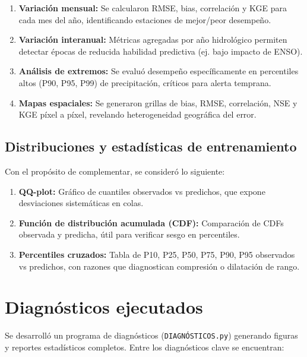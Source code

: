 \begin{enumerate}
    \item \textbf{Variación mensual:} Se calcularon RMSE, bias, correlación y KGE para cada mes del año, identificando estaciones de mejor/peor desempeño.
    \item \textbf{Variación interanual:} Métricas agregadas por año hidrológico permiten detectar épocas de reducida habilidad predictiva (ej. bajo impacto de ENSO).
    \item \textbf{Análisis de extremos:} Se evaluó desempeño específicamente en percentiles altos (P90, P95, P99) de precipitación, críticos para alerta temprana.
    \item \textbf{Mapas espaciales:} Se generaron grillas de bias, RMSE, correlación, NSE y KGE píxel a píxel, revelando heterogeneidad geográfica del error.
\end{enumerate}

\subsection{Distribuciones y estadísticas de entrenamiento}

Con el propósito de complementar, se consideró lo siguiente:
\begin{enumerate}
    \item \textbf{QQ-plot:} Gráfico de cuantiles observados vs predichos, que expone desviaciones sistemáticas en colas.
    \item \textbf{Función de distribución acumulada (CDF):} Comparación de CDFs observada y predicha, útil para verificar sesgo en percentiles.
    \item \textbf{Percentiles cruzados:} Tabla de P10, P25, P50, P75, P90, P95 observados vs predichos, con razones que diagnostican compresión o dilatación de rango.
\end{enumerate}

\section{Diagnósticos ejecutados}
\label{sec:diagnosticos}

Se desarrolló un programa de diagnósticos (\texttt{DIAGNÓSTICOS.py}) generando figuras y reportes estadísticos completos. Entre los diagnósticos clave se encuentran:

